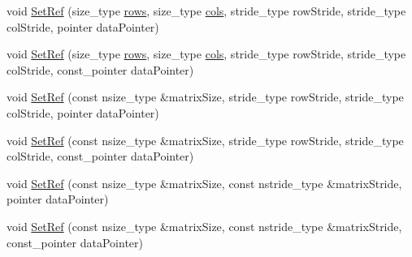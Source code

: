 {\bf }\par
\begin{DoxyCompactItemize}
\item 
void \hyperlink{classvct_dynamic_const_matrix_ref_a5f4c43a9600e4cf979d3daf0a466443a}{Set\+Ref} (size\+\_\+type \hyperlink{classvct_dynamic_const_matrix_base_a5eac13be2207ebeb8766cde379d73438}{rows}, size\+\_\+type \hyperlink{classvct_dynamic_const_matrix_base_aa6c51d41a100da49a7e7ac7edb20ecd9}{cols}, stride\+\_\+type row\+Stride, stride\+\_\+type col\+Stride, pointer data\+Pointer)
\item 
void \hyperlink{classvct_dynamic_const_matrix_ref_ac5ecb9f96a3cfc67d87ca1c7ddd0ed43}{Set\+Ref} (size\+\_\+type \hyperlink{classvct_dynamic_const_matrix_base_a5eac13be2207ebeb8766cde379d73438}{rows}, size\+\_\+type \hyperlink{classvct_dynamic_const_matrix_base_aa6c51d41a100da49a7e7ac7edb20ecd9}{cols}, stride\+\_\+type row\+Stride, stride\+\_\+type col\+Stride, const\+\_\+pointer data\+Pointer)
\item 
void \hyperlink{classvct_dynamic_const_matrix_ref_a18b9973b97e37a3265dcc62cc957bd25}{Set\+Ref} (const nsize\+\_\+type \&matrix\+Size, stride\+\_\+type row\+Stride, stride\+\_\+type col\+Stride, pointer data\+Pointer)
\item 
void \hyperlink{classvct_dynamic_const_matrix_ref_aa7fa0f5ba9ad1ac2520a575ddc965530}{Set\+Ref} (const nsize\+\_\+type \&matrix\+Size, stride\+\_\+type row\+Stride, stride\+\_\+type col\+Stride, const\+\_\+pointer data\+Pointer)
\item 
void \hyperlink{classvct_dynamic_const_matrix_ref_a9d48b0ba4d9f00620e32f3bfb8095722}{Set\+Ref} (const nsize\+\_\+type \&matrix\+Size, const nstride\+\_\+type \&matrix\+Stride, pointer data\+Pointer)
\item 
void \hyperlink{classvct_dynamic_const_matrix_ref_a96ceb12bed491ac0d133bca0d50cc897}{Set\+Ref} (const nsize\+\_\+type \&matrix\+Size, const nstride\+\_\+type \&matrix\+Stride, const\+\_\+pointer data\+Pointer)
\end{DoxyCompactItemize}

